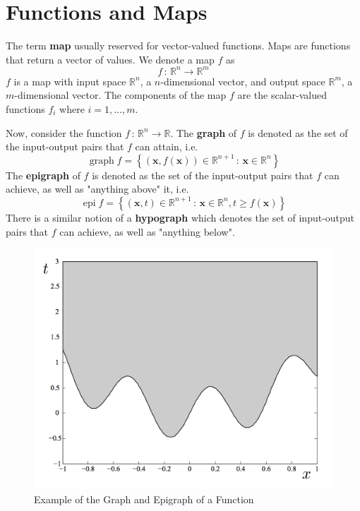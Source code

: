 \documentclass[12pt]{article}
\begin{document}
\section{Functions and Maps}
The term \textbf{map} usually reserved for vector-valued functions. Maps are functions that return a vector of values. We denote a map $f$ as $$f\,:\,\mathbb{R}^n\to\mathbb{R}^m$$ $f$ is a map with input space $\mathbb{R}^n$, a $n$-dimensional vector, and output space $\mathbb{R}^m$, a $m$-dimensional vector. The components of the map $f$ are the scalar-valued functions $f_i$ where $i=1,\ldots,m$. 

\noindent Now, consider the function $f\,:\,\mathbb{R}^n\to \mathbb{R}$. The \textbf{graph} of $f$ is denoted as the set of the input-output pairs that $f$ can attain, i.e. $$\operatorname{graph} f = \left\{(\mathbf{x},f(\mathbf{x}))\in\mathbb{R}^{n+1}\,:\,\mathbf{x}\in\mathbb{R}^n\right\}$$ The \textbf{epigraph} of $f$ is denoted as the set of the input-output pairs that $f$ can achieve, as well as "anything above" it, i.e. $$\operatorname{epi} f = \left\{(\mathbf{x},t)\in\mathbb{R}^{n+1}\,:\,\mathbf{x}\in\mathbb{R}^n, t\geqslant f(\mathbf{x})\right\}$$ There is a similar notion of a \textbf{hypograph} which denotes the set of input-output pairs that $f$ can achieve, as well as "anything below".
 \begin{figure}[h!]\begin{center}\includegraphics[scale=0.4]{figures/graph}\caption{Example of the Graph and Epigraph of a Function}\end{center}\end{figure}
 
\end{document}
